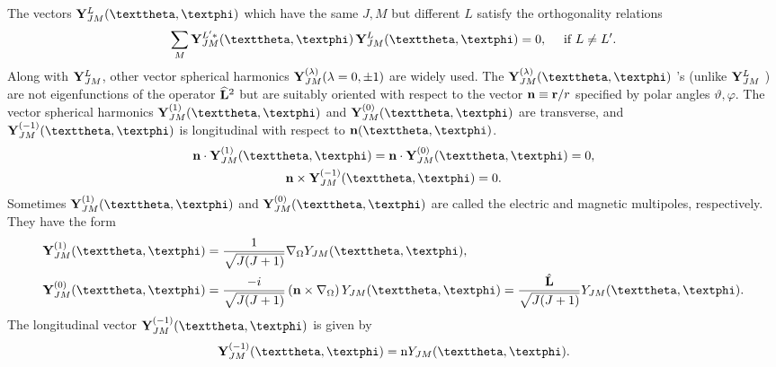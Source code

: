 The vectors $\vect{Y}_{J M}^{L}(\vartheta, \varphi)$ which have the same $J, M$ but different $L$ satisfy the orthogonality relations
\begin{equation}
\sum_{M} \vect{Y}_{J M}^{L^{\prime} *}(\vartheta, \varphi)  \, \vect{Y}_{J M}^{L}(\vartheta, \varphi)=0, \quad \text { if } L \neq L^{\prime}. \label{eq:7:3:4}
\end{equation}
Along with $\mathbf{Y}_{J M}^{L}$, other vector spherical harmonics $\mathbf{Y}_{J M}^{(\lambda)}(\lambda=0, \pm 1)$ are widely used. The $\vect{Y}_{J M}^{(\lambda)}(\vartheta, \varphi)$ 's (unlike $\mathbf{Y}_{J M}^{L}$ ) are not eigenfunctions of the operator $\widehat{\mathbf{L}}^{2}$ but are suitably oriented with respect to the vector $\mathbf{n} \equiv \mathbf{r} / r$ specified by polar angles $\vartheta, \varphi$. The vector spherical harmonics $\vect{Y}_{J M}^{(1)}(\vartheta, \varphi)$ and $\vect{Y}_{J M}^{(0)}(\vartheta, \varphi)$ are transverse, and $\vect{Y}_{J M}^{(-1)}(\vartheta, \varphi)$ is longitudinal with respect to $\vect{n}(\vartheta, \varphi)$.
\begin{gather}
\vect{n} \cdot \vect{Y}_{J M}^{(1)}(\vartheta, \varphi)=\vect{n} \cdot \vect{Y}_{J M}^{(0)}(\vartheta, \varphi)=0, \notag\\
\vect{n} \times \vect{Y}_{J M}^{(-1)}(\vartheta, \varphi)=0. \label{eq:7:3:5}
\end{gather}
Sometimes $\vect{Y}_{J M}^{(1)}(\vartheta, \varphi)$ and $\vect{Y}_{J M}^{(0)}(\vartheta, \varphi)$ are called the electric and magnetic multipoles, respectively. They have the form
\begin{align}
& \vect{Y}_{J M}^{(1)}(\vartheta, \varphi)=\frac{1}{\sqrt{J(J+1)}} \nabla_{\Omega} Y_{J M}(\vartheta, \varphi), \notag\\
& \vect{Y}_{J M}^{(0)}(\vartheta, \varphi)=\frac{-i}{\sqrt{J(J+1)}}\left(\vect{n} \times \nabla_{\Omega}\right) Y_{J M}(\vartheta, \varphi)=\frac{\hat{\vect{L}}}{\sqrt{J(J+1)}} Y_{J M}(\vartheta, \varphi). \label{eq:7:3:6}
\end{align}
The longitudinal vector $\vect{Y}_{J M}^{(-1)}(\vartheta, \varphi)$ is given by
\begin{equation}
\vect{Y}_{J M}^{(-1)}(\vartheta, \varphi)=\mathrm{n} Y_{J M}(\vartheta, \varphi). \label{eq:7:3:7}
\end{equation}
